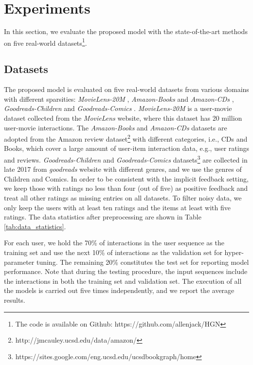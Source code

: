 \documentclass[sigconf]{acmart}
\begin{document}
\section{Experiments} \label{sec:evaluation}
In this section, we evaluate the proposed model with the state-of-the-art methods on five real-world datasets\footnote{The code is available on Github: https://github.com/allenjack/HGN}.

\subsection{Datasets}
The proposed model is evaluated on five real-world datasets from various domains with different sparsities: \textit{MovieLens-20M} \cite{DBLP:journals/tiis/HarperK16}, \textit{Amazon-Books} and \textit{Amazon-CDs} \cite{DBLP:conf/www/HeM16}, \textit{Goodreads-Children} and \textit{Goodreads-Comics} \cite{DBLP:conf/recsys/WanM18}. \textit{MovieLens-20M} is a user-movie dataset collected from the \textit{MovieLens} website, where this dataset has 20 million user-movie interactions. The \textit{Amazon-Books} and \textit{Amazon-CDs} datasets are adopted from the Amazon review dataset\footnote{http://jmcauley.ucsd.edu/data/amazon/} with different categories, i.e., CDs and Books, which cover a large amount of user-item interaction data, e.g., user ratings and reviews. \textit{Goodreads-Children} and \textit{Goodreads-Comics} datasets\footnote{https://sites.google.com/eng.ucsd.edu/ucsdbookgraph/home} are collected in late 2017 from \textit{goodreads} website with different genres, and we use the genres of Children and Comics. In order to be consistent with the implicit feedback setting, we keep those with ratings no less than four (out of five) as positive feedback and treat all other ratings as missing entries on all datasets. To filter noisy data, we only keep the users with at least ten ratings and the items at least with five ratings. The data statistics after preprocessing are shown in Table \ref{tab:data_statistics}. 

For each user, we hold the 70\% of interactions in the user sequence as the training set and use the next 10\% of interactions as the validation set for hyper-parameter tuning. The remaining 20\% constitutes the test set for reporting model performance. Note that during the testing procedure, the input sequences include the interactions in both the training set and validation set. The execution of all the models is carried out five times independently, and we report the average results.
\end{document}

